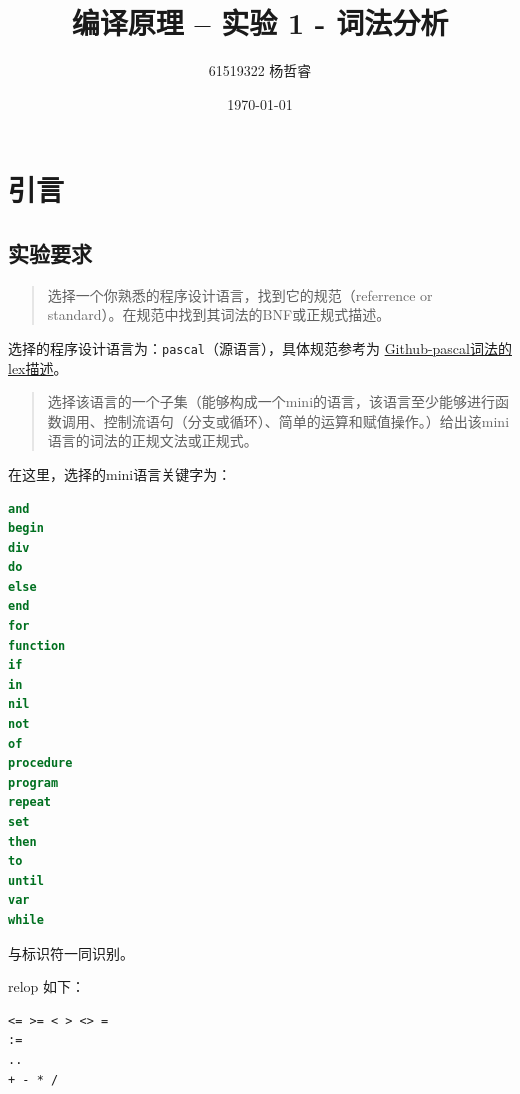 \documentclass[lang=cn]{elegantpaper}
\title{编译原理 -- 实验 1 - 词法分析}
\author{61519322 杨哲睿}
\date{\today}
\begin{document}
\maketitle

\tableofcontents




\section{引言}

\subsection{实验要求}

\begin{quote}
    选择一个你熟悉的程序设计语言，找到它的规范（referrence or standard）。在规范中找到其词法的BNF或正规式描述。
\end{quote}

\begin{remark}
    选择的程序设计语言为：\lstinline|pascal|（源语言），具体规范参考为 \hyperref{https://github.com/bonzini/flex/blob/master/examples/manual/pascal.lex}{}{}{Github-pascal词法的lex描述}。
\end{remark}

\begin{quotation}
    选择该语言的一个子集（能够构成一个mini的语言，该语言至少能够进行函数调用、控制流语句（分支或循环）、简单的运算和赋值操作。）给出该mini语言的词法的正规文法或正规式。
    
\end{quotation}

在这里，选择的mini语言关键字为：

\begin{lstlisting}[language=pascal]
and
begin
div
do
else
end
for
function
if
in
nil
not
of
procedure
program
repeat
set
then
to
until
var
while
\end{lstlisting}
与标识符一同识别。

relop 如下：

\begin{lstlisting}[language=pascal]
<= >= < > <> =
:=
..
+ - * /
\end{lstlisting}
\end{document}
